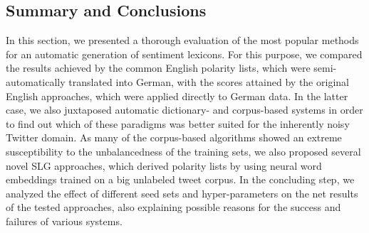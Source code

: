 
\subsection{Summary and Conclusions}

In this section, we presented a thorough evaluation of the most
popular methods for an automatic generation of sentiment lexicons.
For this purpose, we compared the results achieved by the common
English polarity lists, which were semi-automatically translated into
German, with the scores attained by the original English approaches,
which were applied directly to German data.  In the latter case, we
also juxtaposed automatic dictionary- and corpus-based systems in
order to find out which of these paradigms was better suited for the
inherently noisy Twitter domain.  As many of the corpus-based
algorithms showed an extreme susceptibility to the unbalancedness of
the training sets, we also proposed several novel SLG approaches,
which derived polarity lists by using neural word embeddings trained
on a big unlabeled tweet corpus.  In the concluding step, we analyzed
the effect of different seed sets and hyper-parameters on the net
results of the tested approaches, also explaining possible reasons for
the success and failures of various systems.

